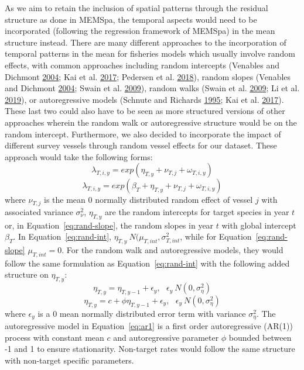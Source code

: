 \documentclass[12pt]{article}\usepackage[]{graphicx}\usepackage[]{color}
\begin{document}
As we aim to retain the inclusion of spatial patterns through the residual structure as done in MEMSpa, the temporal aspects would need to be incorporated (following the regression framework of MEMSpa) in the mean structure instead. There are many different approaches to the incorporation of temporal patterns in the mean for fisheries models which usually involve random effects, with common approaches including random intercepts (Venables and Dichmont \protect\hyperlink{ref-Venables2004}{2004}; Kai et al. \protect\hyperlink{ref-Kai2017}{2017}; Pedersen et al. \protect\hyperlink{ref-Pedersen2018}{2018}), random slopes (Venables and Dichmont \protect\hyperlink{ref-Venables2004}{2004}; Swain et al. \protect\hyperlink{ref-Swain2009}{2009}), random walks (Swain et al. \protect\hyperlink{ref-Swain2009}{2009}; Li et al. \protect\hyperlink{ref-Li2019}{2019}), or autoregressive models (Schnute and Richards \protect\hyperlink{ref-Schnute1995}{1995}; Kai et al. \protect\hyperlink{ref-Kai2017}{2017}). These last two could also have to be seen as more structured versions of other approaches wherein the random walk or autoregressive structure would be on the random intercept. Furthermore, we also decided to incorporate the impact of different survey vessels through random vessel effects for our dataset. These approach would take the following forms:
\begin{equation}\label{eq:rand-int}
\lambda_{T,i,y} = exp(\eta_{T,y}+ \nu_{T,j}+\omega_{T,i,y})
\end{equation} \begin{equation}\label{eq:rand-slope}
\lambda_{T,i,y} = exp(\beta_T+\eta_{T,y}+ \nu_{T,j}+\omega_{T,i,y})
\end{equation}
where \(\nu_{T,j}\) is the mean 0 normally distributed random effect of vessel \(j\) with associated variance \(\sigma_\nu^2\), \(\eta_{T,y}\) are the random intercepts for target species in year \(t\) or, in Equation~\ref{eq:rand-slope}, the random slopes in year \(t\) with global intercept \(\beta_T\). In Equation~\ref{eq:rand-int}, \(\eta_{T,y} ~ N(\mu_{T,int},\sigma_{T,int}^2\), while for Equation~\ref{eq:rand-slope} \(\mu_{T,int}=0\). For the random walk and autoregressive models, they would follow the same formulation as Equation~\ref{eq:rand-int} with the following added structure on \(\eta_{T,y}\):
\begin{equation}\label{eq:rand-walk}
\eta_{T,y} = \eta_{T,y-1} + \epsilon_y, \ \ \ \epsilon_y ~ N(0,\sigma_\eta^2)
\end{equation} \begin{equation}\label{eq:ar1}
\eta_{T,y} = c + \phi \eta_{T,y-1} + \epsilon_y, \ \ \ \epsilon_y ~ N(0,\sigma_\eta^2)
\end{equation}
where \(\epsilon_y\) is a 0 mean normally distributed error term with variance \(\sigma_\eta^2\). The autoregressive model in Equation~\ref{eq:ar1} is a first order autoregressive (AR(1)) process with constant mean \(c\) and autoregressive parameter \(\phi\) bounded between -1 and 1 to ensure stationarity. Non-target rates would follow the same structure with non-target specific parameters.
\end{document}
